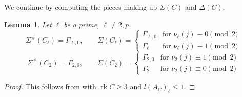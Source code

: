 \documentclass{amsart}
\theoremstyle{definition}
\theoremstyle{plain}
\newtheorem{lemma}[definition]{Lemma}
\DeclareMathOperator{\rk}{rk}
\begin{document}
We continue by computing the pieces making up $\Sigma(C)$ and $\Delta(C)$.
\begin{lemma}
 Let $\ell$ be a prime, $\ell \neq 2, p$. 
 \begin{equation}\label{eqn:SCq}
\Sigma^\#(C_\ell)= \Gamma_{\ell,0},
 \qquad
\Sigma(C_\ell)=
 \begin{cases}
 \Gamma_{\ell,0} & \mbox{for }\nu_\ell(j) \equiv 0 \pmod 2\\
  \Gamma_\ell &\mbox{for } \nu_\ell(j) \equiv 1 \pmod 2
 \end{cases}
 \end{equation}
 \begin{equation}\label{eqn:SC2}
\Sigma^\#(C_2)= \Gamma_{2,0},
 \qquad
\Sigma(C_2)=
 \begin{cases}
 \Gamma_{2,0} & \mbox{for }\nu_2(j) \equiv 1 \pmod 2\\
  \Gamma_2 &\mbox{for } \nu_2(j) \equiv 0 \pmod 2
 \end{cases}
 \end{equation}
 \end{lemma}
\begin{proof}
This follows from \cite[VII \S 12]{miranda_morrison:embeddings} with $\rk C \geq 3$ and $l(A_C)_\ell \leq 1$.
\end{proof}
\end{document}

